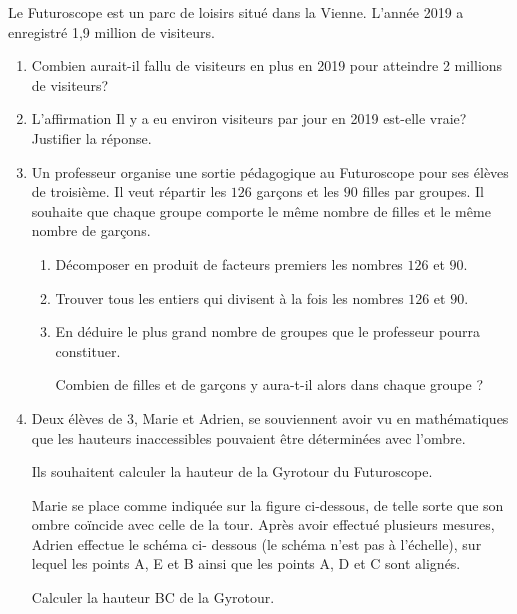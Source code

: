 \documentclass[exercice,a4]{thedocument}%
\begin{document}
%


\medskip

Le Futuroscope est un parc de loisirs situé dans la Vienne. L'année 2019 a enregistré 1,9 million de visiteurs.

\medskip

\begin{enumerate}
\item Combien aurait-il fallu de visiteurs en plus en 2019 pour atteindre 2 millions de visiteurs?
\item L'affirmation \og Il y a eu environ  visiteurs par jour en 2019 \fg{} est-elle vraie? Justifier la réponse.
\item Un professeur organise une sortie pédagogique au Futuroscope pour ses élèves de troisième. Il veut répartir les $126$ garçons et les $90$ filles par groupes. Il souhaite que chaque groupe comporte le même nombre de filles et le même nombre de garçons.
	\begin{enumerate}
		\item Décomposer en produit de facteurs premiers les nombres $126$ et $90$.
		\item Trouver tous les entiers qui divisent à la fois les nombres $126$ et $90$.
		\item En déduire le plus grand nombre de groupes que le professeur pourra
constituer.

Combien de filles et de garçons y aura-t-il alors dans chaque groupe ?
	\end{enumerate}
\item Deux élèves de 3, Marie et Adrien, se souviennent avoir vu en mathématiques que les hauteurs inaccessibles pouvaient être déterminées avec l'ombre.

Ils souhaitent calculer la hauteur de la Gyrotour du Futuroscope.

Marie se place comme indiquée sur la figure ci-dessous, de telle sorte que son ombre coïncide avec celle de la tour. Après avoir effectué plusieurs mesures, Adrien effectue le schéma ci- dessous (le schéma n'est pas à l'échelle), sur lequel les points A, E et B ainsi que les points A, D et C sont alignés.

Calculer la hauteur BC de la Gyrotour.
\end{enumerate}
\end{document}
